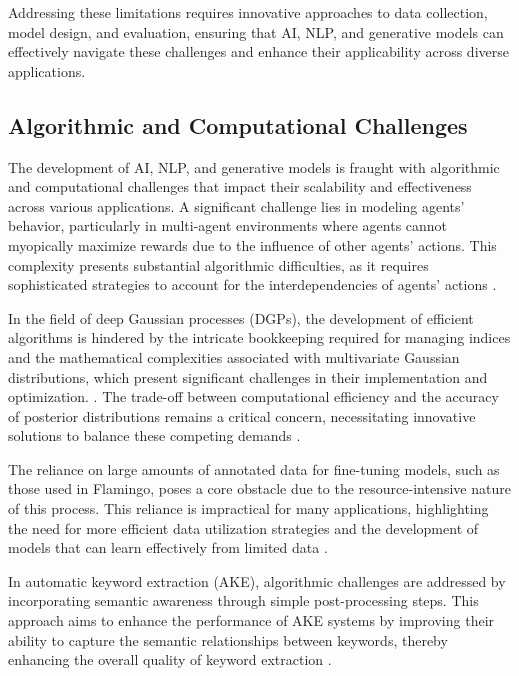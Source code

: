 Addressing these limitations requires innovative approaches to data collection, model design, and evaluation, ensuring that AI, NLP, and generative models can effectively navigate these challenges and enhance their applicability across diverse applications.



\subsection{Algorithmic and Computational Challenges} \label{subsec:Algorithmic and Computational Challenges}

The development of AI, NLP, and generative models is fraught with algorithmic and computational challenges that impact their scalability and effectiveness across various applications. A significant challenge lies in modeling agents' behavior, particularly in multi-agent environments where agents cannot myopically maximize rewards due to the influence of other agents' actions. This complexity presents substantial algorithmic difficulties, as it requires sophisticated strategies to account for the interdependencies of agents' actions \cite{waugh2011computationalrationalizationinverseequilibrium}.



In the field of deep Gaussian processes (DGPs), the development of efficient algorithms is hindered by the intricate bookkeeping required for managing indices and the mathematical complexities associated with multivariate Gaussian distributions, which present significant challenges in their implementation and optimization. \cite{dutordoir2021gpfluxlibrarydeepgaussian,lindinger2020meanfieldstructureddeepgaussian}. The trade-off between computational efficiency and the accuracy of posterior distributions remains a critical concern, necessitating innovative solutions to balance these competing demands .



The reliance on large amounts of annotated data for fine-tuning models, such as those used in Flamingo, poses a core obstacle due to the resource-intensive nature of this process. This reliance is impractical for many applications, highlighting the need for more efficient data utilization strategies and the development of models that can learn effectively from limited data \cite{alayrac2022flamingo}.



In automatic keyword extraction (AKE), algorithmic challenges are addressed by incorporating semantic awareness through simple post-processing steps. This approach aims to enhance the performance of AKE systems by improving their ability to capture the semantic relationships between keywords, thereby enhancing the overall quality of keyword extraction \cite{altuncu2022improvingperformanceautomatickeyword}.



